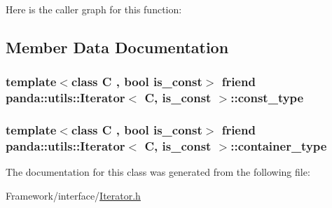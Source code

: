 Here is the caller graph for this function:

\subsection{Member Data Documentation}
\hypertarget{classpanda_1_1utils_1_1Iterator_af203547ac2e312fa79abc7bfdd8fd5a1}{
\subsubsection[{const\_\-type}]{\setlength{\rightskip}{0pt plus 5cm}template$<$class C , bool is\_\-const$>$ friend {\bf panda::utils::Iterator}$<$ C, is\_\-const $>$::{\bf const\_\-type}}}
\label{classpanda_1_1utils_1_1Iterator_af203547ac2e312fa79abc7bfdd8fd5a1}
\hypertarget{classpanda_1_1utils_1_1Iterator_a9f6858f9658d84406448bc3375212077}{
\subsubsection[{container\_\-type}]{\setlength{\rightskip}{0pt plus 5cm}template$<$class C , bool is\_\-const$>$ friend {\bf panda::utils::Iterator}$<$ C, is\_\-const $>$::{\bf container\_\-type}}}
\label{classpanda_1_1utils_1_1Iterator_a9f6858f9658d84406448bc3375212077}


The documentation for this class was generated from the following file:\begin{DoxyCompactItemize}
\item 
Framework/interface/\hyperlink{Iterator_8h}{Iterator.h}\end{DoxyCompactItemize}
